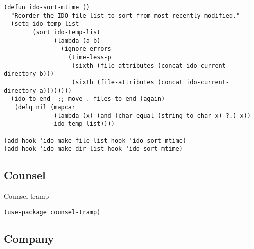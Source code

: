 \documentclass[12pt]{article}
\begin{document}
\begin{verbatim}
(defun ido-sort-mtime ()
  "Reorder the IDO file list to sort from most recently modified."
  (setq ido-temp-list
        (sort ido-temp-list
              (lambda (a b)
                (ignore-errors
                  (time-less-p
                   (sixth (file-attributes (concat ido-current-directory b)))
                   (sixth (file-attributes (concat ido-current-directory a))))))))
  (ido-to-end  ;; move . files to end (again)
   (delq nil (mapcar
              (lambda (x) (and (char-equal (string-to-char x) ?.) x))
              ido-temp-list))))

(add-hook 'ido-make-file-list-hook 'ido-sort-mtime)
(add-hook 'ido-make-dir-list-hook 'ido-sort-mtime)

\end{verbatim}

\subsection{Counsel}
\label{sec:orged39558}
Counsel tramp 
\begin{verbatim}
(use-package counsel-tramp)
\end{verbatim}

\subsection{Company}
\label{sec:org74ab1dd}
\end{document}
